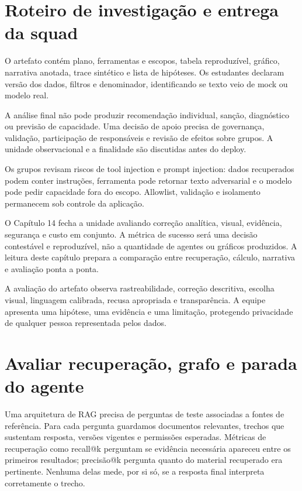 \section{Roteiro de investigação e entrega da squad}

O artefato contém plano, ferramentas e escopos, tabela reproduzível, gráfico, narrativa anotada, trace sintético e lista de hipóteses. Os estudantes declaram versão dos dados, filtros e denominador, identificando se texto veio de mock ou modelo real.

A análise final não pode produzir recomendação individual, sanção, diagnóstico ou previsão de capacidade. Uma decisão de apoio precisa de governança, validação, participação de responsáveis e revisão de efeitos sobre grupos. A unidade observacional e a finalidade são discutidas antes do deploy.

Os grupos revisam riscos de tool injection e prompt injection: dados recuperados podem conter instruções, ferramenta pode retornar texto adversarial e o modelo pode pedir capacidade fora do escopo. Allowlist, validação e isolamento permanecem sob controle da aplicação.

O Capítulo 14 fecha a unidade avaliando correção analítica, visual, evidência, segurança e custo em conjunto. A métrica de sucesso será uma decisão contestável e reproduzível, não a quantidade de agentes ou gráficos produzidos. A leitura deste capítulo prepara a comparação entre recuperação, cálculo, narrativa e avaliação ponta a ponta.

A avaliação do artefato observa rastreabilidade, correção descritiva, escolha visual, linguagem calibrada, recusa apropriada e transparência. A equipe apresenta uma hipótese, uma evidência e uma limitação, protegendo privacidade de qualquer pessoa representada pelos dados.

\section{Avaliar recuperação, grafo e parada do agente}

Uma arquitetura de RAG precisa de perguntas de teste associadas a fontes de referência. Para cada pergunta guardamos documentos relevantes, trechos que sustentam resposta, versões vigentes e permissões esperadas. Métricas de recuperação como recall@k perguntam se evidência necessária apareceu entre os primeiros resultados; precisão@k pergunta quanto do material recuperado era pertinente. Nenhuma delas mede, por si só, se a resposta final interpreta corretamente o trecho.

